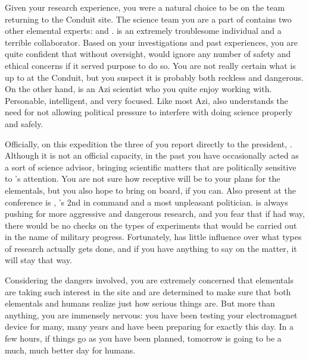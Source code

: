 \documentclass[char]{elementals}
\begin{document}
Given your research experience, you were a natural choice to be on the team returning to the Conduit site. The science team you are a part of contains two other elemental experts: \cMS{\intro} and \cScientist{\intro}. \cMS{} is an extremely troublesome individual and a terrible collaborator. Based on your investigations and past experiences, you are quite confident that without oversight, \cMS{\they} would ignore any number of safety and ethical concerns if it served \cMS{\their} purpose to do so. You are not really certain what \cMS{\they} is up to at the Conduit, but you suspect it is probably both reckless and dangerous. On the other hand, \cScientist{} is an Azi scientist who you quite enjoy working with. Personable, intelligent, and very focused. Like most Azi, \cScientist{\they} also understands the need for not allowing political pressure to interfere with doing science properly and safely.

Officially, on this expedition the three of you report directly to the president, \cLeader{\intro}. Although it is not an official capacity, in the past you have occasionally acted as a sort of science advisor, bringing scientific matters that are politically sensitive to \cLeader{}'s attention. You are not sure how receptive \cLeader{\they} will be to your plans for the elementals, but you also hope to bring \cLeader{\them} on board, if you can. Also present at the conference is \cDema{\intro}, \cLeader{}'s 2nd in command and a most unpleasant politician. \cDema{\They} is always pushing for more aggressive and dangerous research, and you fear that if \cDema{\they} had \cDema{\their} way, there would be no checks on the types of experiments that would be carried out in the name of military progress. Fortunately, \cDema{\they} has little influence over what types of research actually gets done, and if you have anything to say on the matter, it will stay that way.

Considering the dangers involved, you are extremely concerned that elementals are taking such interest in the site and are determined to make sure that both elementals and humans realize just how serious things are. But more than anything, you are immensely nervous: you have been testing your electromagnet device for many, many years and have been preparing for exactly this day. In a few hours, if things go as you have been planned, tomorrow is going to be a much, much better day for humans.

\end{document}
